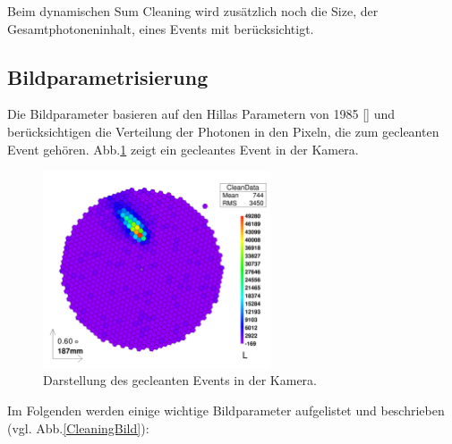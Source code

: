 Beim dynamischen Sum Cleaning wird zusätzlich noch die Size, der Gesamtphotoneninhalt, eines Events mit berücksichtigt.

\subsection{Bildparametrisierung}
Die Bildparameter basieren auf den Hillas Parametern von 1985 [] und berücksichtigen die Verteilung der Photonen in den Pixeln, die zum gecleanten Event gehören.
Abb.\ref{Kamera-Bild-gecleant} zeigt ein gecleantes Event in der Kamera.

\begin{figure}
    \centering
    \includegraphics[width=0.6\textwidth]{./Plots/03_MonteCarlos/Signal_gecleant_fertig.png}
    \caption{Darstellung des gecleanten Events in der Kamera.}
    \label{Kamera-Bild-gecleant}
\end{figure}


Im Folgenden werden einige wichtige Bildparameter aufgelistet und beschrieben (vgl. Abb.\ref{CleaningBild}):

